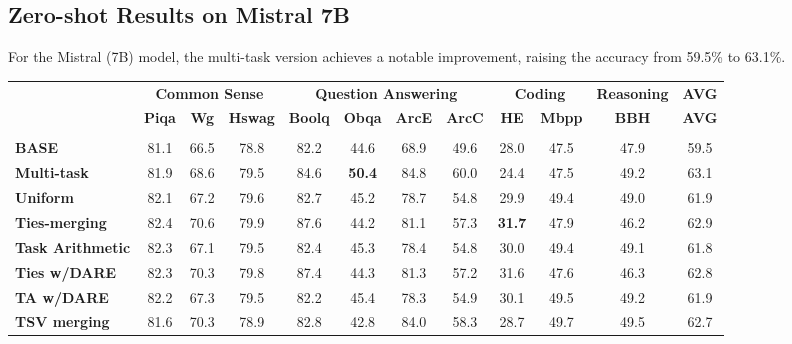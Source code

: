 \documentclass[10pt]{article} %
\begin{document}
\subsection{Zero-shot Results on Mistral 7B}
\label{sec:zero_shot_mistral}

For the Mistral (7B) model, the multi-task
version achieves a notable improvement, raising the accuracy from 59.5\% to
    63.1\%.
\begin{table}[ht]
\small
\centering
\begin{adjustbox}
{width=1.0\textwidth}
\begin{tabular}{l|cccccccccc|c} 
\Xhline{1.6pt}
\multicolumn{1}{c|}{} & \multicolumn{3}{c}{\textbf{Common Sense}} & \multicolumn{4}{c}{\textbf{Question Answering}} & \multicolumn{2}{c}{\textbf{Coding}} & \multicolumn{1}{c}{\textbf{ Reasoning}} & \multicolumn{1}{c}{\textbf{AVG}} \\
\cmidrule(lr){2-4}  \cmidrule(lr){5-8} \cmidrule(lr){9-10}
\cmidrule(lr){11-11}
\multicolumn{1}{c|}{} & \textbf{Piqa} & \textbf{Wg} & \textbf{Hswag} & \textbf{Boolq} & \textbf{Obqa} & \textbf{ArcE} & \textbf{ArcC} & \textbf{HE} & \textbf{Mbpp} & \textbf{BBH} & \multicolumn{1}{c}{\textbf{AVG}} \\
\midrule

\rowcolor{lightgray}\multicolumn{12}{c}{\textbf{Mistral (7B) with LoRA library}  } \\
\textbf{BASE}  & 81.1  & 66.5  & 78.8  & 82.2 & 44.6 & 68.9 & 49.6 & 28.0 & 47.5 & 47.9 & \cellcolor[HTML]{FDE9E8}59.5\\ 
\textbf{Multi-task}  & 81.9 & 68.6 & 79.5 & 84.6 & \textbf{50.4} & 84.8 & 60.0 & 24.4 & 47.5 & 49.2 & \cellcolor[HTML]{FDE9E8}63.1 \\

\textbf{Uniform}& 82.1 & 67.2 & 79.6 & 82.7 & 45.2 & 78.7 & 54.8 & 29.9 & 49.4 & 49.0 &  \cellcolor[HTML]{FDE9E8}61.9 \\

\textbf{Ties-merging} & 82.4 & 70.6 & 79.9 & 87.6 & 44.2 & 81.1 & 57.3 & \textbf{31.7} & 47.9 & 46.2 & \cellcolor[HTML]{FDE9E8}62.9 \\
\textbf{Task Arithmetic} & 82.3 & 67.1 & 79.5 & 82.4 & 45.3 & 78.4 & 54.8 & 30.0 & 49.4 & 49.1 &  \cellcolor[HTML]{FDE9E8}61.8\\
\textbf{Ties w/DARE} & 82.3 & 70.3 & 79.8 & 87.4 & 44.3 & 81.3 & 57.2 & 31.6 & 47.6 & 46.3 & \cellcolor[HTML]{FDE9E8}62.8\\
\textbf{TA w/DARE} & 82.2 & 67.3 & 79.5 & 82.2 & 45.4 & 78.3 & 54.9 & 30.1 & 49.5 & 49.2 & \cellcolor[HTML]{FDE9E8}61.9\\
\textbf{TSV merging} & 81.6 & 70.3 & 78.9 & 82.8 & 42.8 & 84.0 & 58.3 & 28.7 & 49.7 & 49.5 & 62.7\cellcolor[HTML]{FDE9E8}\\


\end{tabular}
\end{adjustbox}
\end{table}
\end{document}
